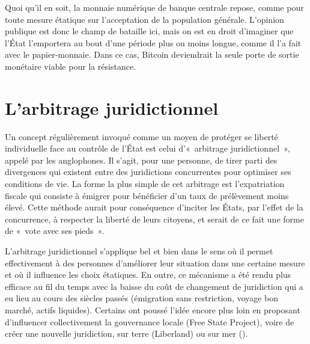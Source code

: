 Quoi qu'il en soit, la monnaie numérique de banque centrale repose, comme pour toute mesure étatique sur l'acceptation de la population générale. L'opinion publique est donc le champ de bataille ici, mais on est en droit d'imaginer que l'État l'emportera au bout d'une période plus ou moins longue, comme il l'a fait avec le papier-monnaie. Dans ce cas, Bitcoin deviendrait la seule porte de sortie monétaire viable pour la résistance.



\section*{L'arbitrage juridictionnel}

Un concept régulièrement invoqué comme un moyen de protéger se liberté individuelle face au contrôle de l'État est celui d'«~arbitrage juridictionnel~», appelé  par les anglophones. Il s'agit, pour une personne, de tirer parti des divergences qui existent entre des juridictions concurrentes pour optimiser ses conditions de vie. La forme la plus simple de cet arbitrage est l'expatriation fiscale qui consiste à émigrer pour bénéficier d'un taux de prélèvement moins élevé. Cette méthode aurait pour conséquence d'inciter les États, par l'effet de la concurrence, à respecter la liberté de leurs citoyens, et serait de ce fait une forme de «~vote avec ses pieds~».


L'arbitrage juridictionnel s'applique bel et bien dans le sens où il permet effectivement à des personnes d'améliorer leur situation dans une certaine mesure et où il influence les choix étatiques. En outre, ce mécanisme a été rendu plus efficace au fil du temps avec la baisse du coût de changement de juridiction qui a eu lieu au cours des siècles passés (émigration sans restriction, voyage bon marché, actifs liquides). Certains ont poussé l'idée encore plus loin en proposant d'influencer collectivement la gouvernance locale (Free State Project), voire de créer une nouvelle juridiction, sur terre (Liberland) ou sur mer ().

